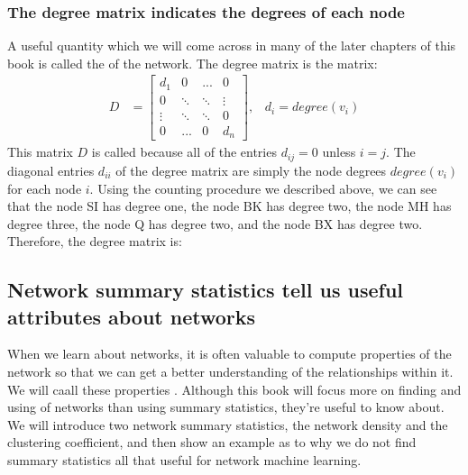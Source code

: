\documentclass[letterpaper,10pt,english]{jupyterBook}
\begin{document}
\subsubsection{The degree matrix indicates the degrees of each node}
\label{\detokenize{representations/ch4/properties-of-networks:the-degree-matrix-indicates-the-degrees-of-each-node}}
\sphinxAtStartPar
A useful quantity which we will come across in many of the later chapters of this book is called the  of the network. The degree matrix is the  matrix:
\begin{align*}
    D &= \begin{bmatrix}
        d_1 & 0 & ... & 0 \\
        0 & \ddots & \ddots& \vdots \\
        \vdots & \ddots & \ddots & 0 \\
        0 & ... & 0 & d_n
    \end{bmatrix}, \;\;\; d_i = degree(v_i)
\end{align*}
\sphinxAtStartPar
This matrix \(D\) is called  because all of the entries \(d_{ij} = 0\) unless \(i = j\). The diagonal entries \(d_{ii}\) of the degree matrix are simply the node degrees \(degree(v_i)\) for each node \(i\). Using the counting procedure we described above, we can see that the node SI has degree one, the node BK has degree two, the node MH has degree three, the node Q has degree two, and the node BX has degree two. Therefore, the degree matrix is:

\noindent{}


\subsection{Network summary statistics tell us useful attributes about networks}
\label{\detokenize{representations/ch4/properties-of-networks:network-summary-statistics-tell-us-useful-attributes-about-networks}}
\sphinxAtStartPar
When we learn about networks, it is often valuable to compute properties of the network so that we can get a better understanding of the relationships within it. We will caall these properties . Although this book will focus more on finding and using  of networks than using summary statistics, they’re useful to know about. We will introduce two network summary statistics, the network density and the clustering coefficient, and then show an example as to why we do not find summary statistics all that useful for network machine learning.
\end{document}
